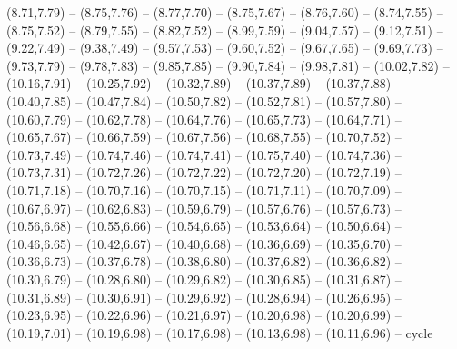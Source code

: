 {(8.71,7.79) -- (8.75,7.76) -- (8.77,7.70) -- (8.75,7.67) -- (8.76,7.60) -- (8.74,7.55) -- (8.75,7.52) -- (8.79,7.55) -- (8.82,7.52) -- (8.99,7.59) -- (9.04,7.57) -- (9.12,7.51) -- (9.22,7.49) -- (9.38,7.49) -- (9.57,7.53) -- (9.60,7.52) -- (9.67,7.65) -- (9.69,7.73) -- (9.73,7.79) -- (9.78,7.83) -- (9.85,7.85) -- (9.90,7.84) -- (9.98,7.81) -- (10.02,7.82) -- (10.16,7.91) -- (10.25,7.92) -- (10.32,7.89) -- (10.37,7.89) -- (10.37,7.88) -- (10.40,7.85) -- (10.47,7.84) -- (10.50,7.82) -- (10.52,7.81) -- (10.57,7.80) -- (10.60,7.79) -- (10.62,7.78) -- (10.64,7.76) -- (10.65,7.73) -- (10.64,7.71) -- (10.65,7.67) -- (10.66,7.59) -- (10.67,7.56) -- (10.68,7.55) -- (10.70,7.52) -- (10.73,7.49) -- (10.74,7.46) -- (10.74,7.41) -- (10.75,7.40) -- (10.74,7.36) -- (10.73,7.31) -- (10.72,7.26) -- (10.72,7.22) -- (10.72,7.20) -- (10.72,7.19) -- (10.71,7.18) -- (10.70,7.16) -- (10.70,7.15) -- (10.71,7.11) -- (10.70,7.09) -- (10.67,6.97) -- (10.62,6.83) -- (10.59,6.79) -- (10.57,6.76) -- (10.57,6.73) -- (10.56,6.68) -- (10.55,6.66) -- (10.54,6.65) -- (10.53,6.64) -- (10.50,6.64) -- (10.46,6.65) -- (10.42,6.67) -- (10.40,6.68) -- (10.36,6.69) -- (10.35,6.70) -- (10.36,6.73) -- (10.37,6.78) -- (10.38,6.80) -- (10.37,6.82) -- (10.36,6.82) -- (10.30,6.79) -- (10.28,6.80) -- (10.29,6.82) -- (10.30,6.85) -- (10.31,6.87) -- (10.31,6.89) -- (10.30,6.91) -- (10.29,6.92) -- (10.28,6.94) -- (10.26,6.95) -- (10.23,6.95) -- (10.22,6.96) -- (10.21,6.97) -- (10.20,6.98) -- (10.20,6.99) -- (10.19,7.01) -- (10.19,6.98) -- (10.17,6.98) -- (10.13,6.98) -- (10.11,6.96) -- cycle}
